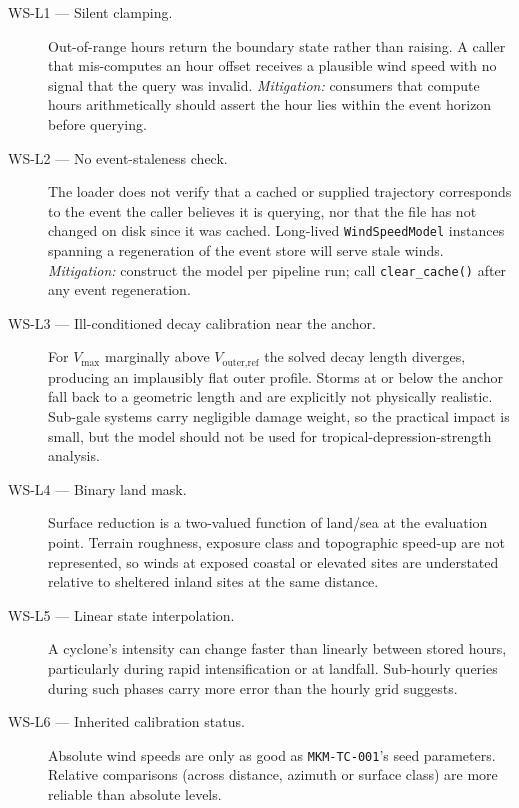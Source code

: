 \documentclass[11pt,a4paper]{article}
\begin{document}
\mkmlimitations
\label{sec:limitations}

\begin{description}
  \item[WS-L1 --- Silent clamping.] Out-of-range hours return the boundary state
        rather than raising. A caller that mis-computes an hour offset receives a
        plausible wind speed with no signal that the query was invalid.
        \emph{Mitigation:} consumers that compute hours arithmetically should
        assert the hour lies within the event horizon before querying.
  \item[WS-L2 --- No event-staleness check.] The loader does not verify that a
        cached or supplied trajectory corresponds to the event the caller
        believes it is querying, nor that the file has not changed on disk since
        it was cached. Long-lived \texttt{WindSpeedModel} instances spanning a
        regeneration of the event store will serve stale winds.
        \emph{Mitigation:} construct the model per pipeline run; call
        \texttt{clear\_cache()} after any event regeneration.
  \item[WS-L3 --- Ill-conditioned decay calibration near the anchor.] For
        $V_{\max}$ marginally above $V_{\text{outer,ref}}$ the solved decay
        length diverges, producing an implausibly flat outer profile. Storms at
        or below the anchor fall back to a geometric length and are explicitly
        not physically realistic. Sub-gale systems carry negligible damage
        weight, so the practical impact is small, but the model should not be
        used for tropical-depression-strength analysis.
  \item[WS-L4 --- Binary land mask.] Surface reduction is a two-valued function
        of land/sea at the evaluation point. Terrain roughness, exposure class
        and topographic speed-up are not represented, so winds at exposed
        coastal or elevated sites are understated relative to sheltered inland
        sites at the same distance.
  \item[WS-L5 --- Linear state interpolation.] A cyclone's intensity can change
        faster than linearly between stored hours, particularly during rapid
        intensification or at landfall. Sub-hourly queries during such phases
        carry more error than the hourly grid suggests.
  \item[WS-L6 --- Inherited calibration status.] Absolute wind speeds are only
        as good as \texttt{MKM-TC-001}'s seed parameters. Relative comparisons
        (across distance, azimuth or surface class) are more reliable than
        absolute levels.
\end{description}
\end{document}
